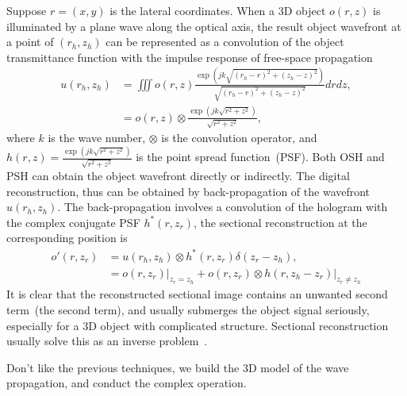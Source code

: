 \documentclass[9pt,twocolumn,twoside]{osajnl}
\begin{document}
Suppose $r=(x,y)$ is the lateral coordinates. When a 3D object $o(r,z)$ is illuminated by a plane wave along the optical axis, the result object wavefront at a point of $(r_h, z_h)$ can be represented as a convolution of the object transmittance function with the impulse response of free-space propagation~\cite{Goodman2005}
\begin{equation}
\begin{aligned}
u(r_h,z_h) 
& = \iiint o(r,z) \frac{\exp\left(jk\sqrt{(r_h-r)^2 + (z_h-z)^2}\right)}{\sqrt{(r_h-r)^2 + (z_h-z)^2}} d r dz, \\
& = o(r,z) \otimes \frac{\exp\left(jk\sqrt{r^2 + z^2}\right)}{\sqrt{r^2 + z^2}},
\label{eq_3ddiffr}
\end{aligned}
\end{equation}
where $k$ is the wave number, $\otimes$ is the convolution operator, and $h(r,z)=\frac{\exp(jk\sqrt{r^2 + z^2})}{\sqrt{r^2 + z^2}}$ is the point spread function~(PSF). 
Both OSH and PSH can obtain the object wavefront directly or indirectly.
The digital reconstruction, thus can be obtained by back-propagation of the  wavefront $u(r_h,z_h)$. The back-propagation involves a convolution of the hologram with the complex conjugate PSF $h^*(r, z_r)$, the sectional reconstruction at the corresponding position is 
\begin{equation}
\begin{aligned}
o'(r,z_r) 
& = u(r_h,z_h)\otimes h^*(r,z_r) \delta(z_r-z_h) , \\
& = o(r,z_r)\vert_{z_r=z_h} + o(r,z_r) \otimes h(r, z_h-z_r) \vert_{z_r \neq z_h}
\label{eq_3ddiffr_inv}
\end{aligned}
\end{equation}
It is clear that the reconstructed sectional image contains an unwanted second term~(the second term), and usually submerges the object signal seriously, especially for a 3D object with complicated structure. Sectional reconstruction usually solve this as an inverse problem~\cite{Zhang2010JOSA}. 


Don't like the previous techniques, we build the 3D model of the wave propagation, and conduct the complex operation.
\end{document}
